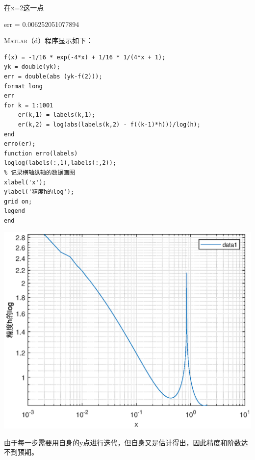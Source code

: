 \documentclass[12pt,a4paper,UTF8]{ctexart}
\begin{document}
\begin{enumerate}
在x=2这一点

err =
0.006252051077894

\textsc{Matlab}（d）程序显示如下：
\begin{lstlisting}[frame=single]
f(x) = -1/16 * exp(-4*x) + 1/16 * 1/(4*x + 1);
yk = double(yk);
err = double(abs (yk-f(2)));
format long
err
for k = 1:1001
    er(k,1) = labels(k,1);
    er(k,2) = log(abs(labels(k,2) - f((k-1)*h)))/log(h);
end
erro(er);
function erro(labels)
loglog(labels(:,1),labels(:,2));
% 记录横轴纵轴的数据画图
xlabel('x');
ylabel('精度h的log');
grid on;
legend
end
\end{lstlisting}
\begin{center}
\includegraphics[scale=1]{3d.eps}
\end{center}

由于每一步需要用自身的y点进行迭代，但自身又是估计得出，因此精度和阶数达不到预期。


\end{enumerate}
\end{document}
